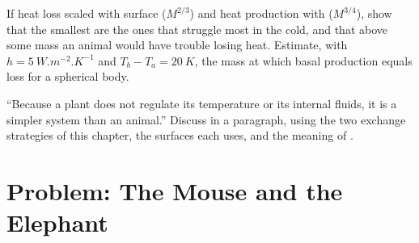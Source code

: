 \begin{exercise}[$\star\star\star$]\label{exo:b1:organism-environment:11}
If heat loss scaled with surface ($M^{2/3}$) and heat production with
 ($M^{3/4}$), show that the smallest  are the
ones that struggle most in the cold, and that above some mass an animal
would have trouble losing heat. Estimate, with $h = \qty{5}{W.m^{-2}.K^{-1}}$
and $T_b - T_a = \qty{20}{K}$, the mass at which basal production
equals loss for a spherical body.
\end{exercise}

\begin{exercise}[$\star\star\star$]\label{exo:b1:organism-environment:12}
``Because a plant does not regulate its temperature or its internal
fluids, it is a simpler system than an animal.'' Discuss in a paragraph,
using the two exchange strategies of this chapter, the surfaces each
uses, and the meaning of .
\end{exercise}

\section{Problem: The Mouse and the Elephant}

